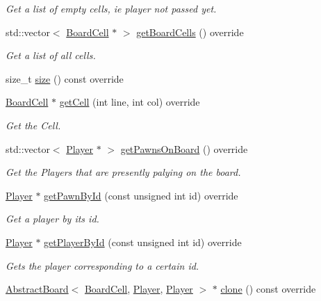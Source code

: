 \begin{DoxyCompactItemize}
\begin{DoxyCompactList}\small\item\em Get a list of empty cells, ie player not passed yet. \end{DoxyCompactList}\item 
std\+::vector$<$ \hyperlink{classgame_1_1tic__tac__toe_1_1_board_cell}{Board\+Cell} $\ast$ $>$ \hyperlink{classgame_1_1tic__tac__toe_1_1_board_af8bc9dc8a2cfed68aa7d9adead27594e}{get\+Board\+Cells} () override
\begin{DoxyCompactList}\small\item\em Get a list of all cells. \end{DoxyCompactList}\item 
size\+\_\+t \hyperlink{classgame_1_1tic__tac__toe_1_1_board_ac9d2d5da2263bb6166f93eec382380db}{size} () const override
\item 
\hyperlink{classgame_1_1tic__tac__toe_1_1_board_cell}{Board\+Cell} $\ast$ \hyperlink{classgame_1_1tic__tac__toe_1_1_board_ab5c00479b4dabd60bef9ea00fce23779}{get\+Cell} (int line, int col) override
\begin{DoxyCompactList}\small\item\em Get the Cell. \end{DoxyCompactList}\item 
std\+::vector$<$ \hyperlink{classgame_1_1tic__tac__toe_1_1_player}{Player} $\ast$ $>$ \hyperlink{classgame_1_1tic__tac__toe_1_1_board_a84cb90a6d844d80ecd5857fb4dc9ad1a}{get\+Pawns\+On\+Board} () override
\begin{DoxyCompactList}\small\item\em Get the Players that are presently palying on the board. \end{DoxyCompactList}\item 
\hyperlink{classgame_1_1tic__tac__toe_1_1_player}{Player} $\ast$ \hyperlink{classgame_1_1tic__tac__toe_1_1_board_a7f11ea8d48d9613057dd8164a7610f9a}{get\+Pawn\+By\+Id} (const unsigned int id) override
\begin{DoxyCompactList}\small\item\em Get a player by it\textquotesingle{}s id. \end{DoxyCompactList}\item 
\hyperlink{classgame_1_1tic__tac__toe_1_1_player}{Player} $\ast$ \hyperlink{classgame_1_1tic__tac__toe_1_1_board_a7907b8fc363b7e33d585edbc7ec102ae}{get\+Player\+By\+Id} (const unsigned int id) override
\begin{DoxyCompactList}\small\item\em Gets the player corresponding to a certain id. \end{DoxyCompactList}\item 
\hyperlink{classgame_1_1_abstract_board}{Abstract\+Board}$<$ \hyperlink{classgame_1_1tic__tac__toe_1_1_board_cell}{Board\+Cell}, \hyperlink{classgame_1_1tic__tac__toe_1_1_player}{Player}, \hyperlink{classgame_1_1tic__tac__toe_1_1_player}{Player} $>$ $\ast$ \hyperlink{classgame_1_1tic__tac__toe_1_1_board_a9d7a2c225f06a3410b11b688d9d6bcf8}{clone} () const override
\end{DoxyCompactItemize}
